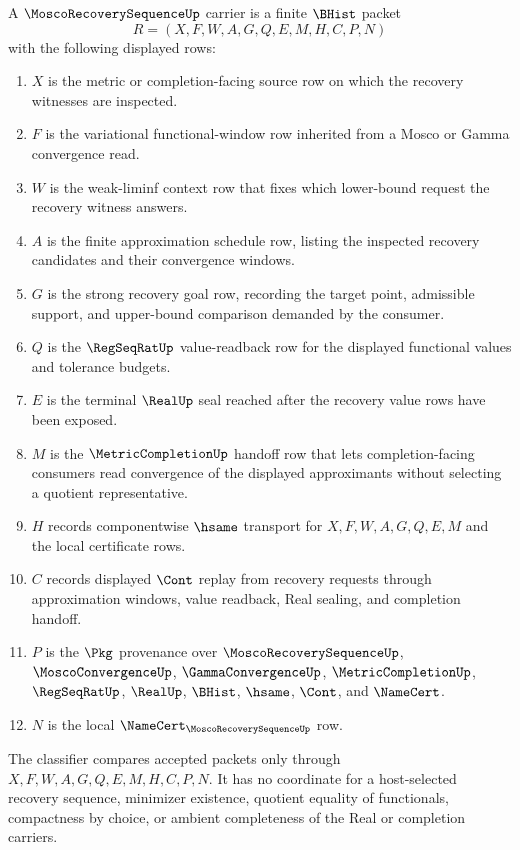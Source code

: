 \begin{definition}
\label{def:mosco-recovery-sequence-carrier}
A $\MoscoRecoverySequenceUp$ carrier is a finite $\BHist$ packet
$$
R=(X,F,W,A,G,Q,E,M,H,C,P,N)
$$
with the following displayed rows:
\begin{enumerate}
\item $X$ is the metric or completion-facing source row on which the recovery witnesses are inspected.
\item $F$ is the variational functional-window row inherited from a Mosco or Gamma convergence read.
\item $W$ is the weak-liminf context row that fixes which lower-bound request the recovery witness answers.
\item $A$ is the finite approximation schedule row, listing the inspected recovery candidates and their convergence windows.
\item $G$ is the strong recovery goal row, recording the target point, admissible support, and upper-bound comparison demanded by the consumer.
\item $Q$ is the $\RegSeqRatUp$ value-readback row for the displayed functional values and tolerance budgets.
\item $E$ is the terminal $\RealUp$ seal reached after the recovery value rows have been exposed.
\item $M$ is the $\MetricCompletionUp$ handoff row that lets completion-facing consumers read convergence of the displayed approximants without selecting a quotient representative.
\item $H$ records componentwise $\hsame$ transport for $X,F,W,A,G,Q,E,M$ and the local certificate rows.
\item $C$ records displayed $\Cont$ replay from recovery requests through approximation windows, value readback, Real sealing, and completion handoff.
\item $P$ is the $\Pkg$ provenance over $\MoscoRecoverySequenceUp$, $\MoscoConvergenceUp$, $\GammaConvergenceUp$, $\MetricCompletionUp$, $\RegSeqRatUp$, $\RealUp$, $\BHist$, $\hsame$, $\Cont$, and $\NameCert$.
\item $N$ is the local $\NameCert_{\MoscoRecoverySequenceUp}$ row.
\end{enumerate}
The classifier compares accepted packets only through $X,F,W,A,G,Q,E,M,H,C,P,N$. It has no coordinate for a host-selected recovery sequence, minimizer existence, quotient equality of functionals, compactness by choice, or ambient completeness of the Real or completion carriers.
\end{definition}

